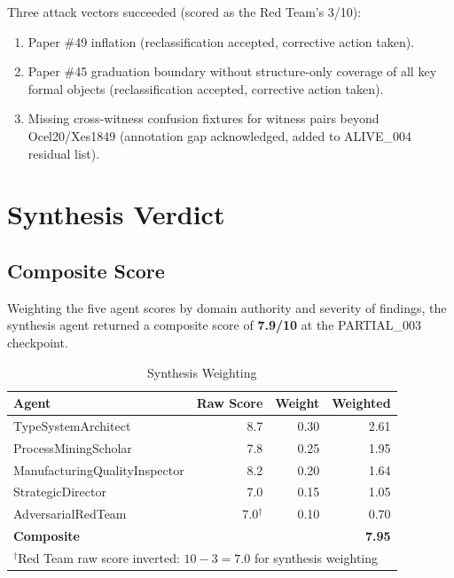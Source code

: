 Three attack vectors succeeded (scored as the Red Team's 3/10):

\begin{enumerate}
  \item Paper \#49 inflation (reclassification accepted, corrective action
    taken).
  \item Paper \#45 graduation boundary without structure-only coverage of all
    key formal objects (reclassification accepted, corrective action taken).
  \item Missing cross-witness confusion fixtures for witness pairs beyond
    Ocel20/Xes1849 (annotation gap acknowledged, added to ALIVE\_004
    residual list).
\end{enumerate}

\section{Synthesis Verdict}
\label{sec:eval-synthesis}

\subsection{Composite Score}

Weighting the five agent scores by domain authority and severity of findings,
the synthesis agent returned a composite score of \textbf{7.9/10} at the
PARTIAL\_003 checkpoint.

\begin{table}[ht]
  \centering
  \caption{Synthesis Weighting}
  \label{tab:eval-synthesis}
  \begin{tabular}{lrrr}
    \toprule
    Agent & Raw Score & Weight & Weighted \\
    \midrule
    TypeSystemArchitect          & 8.7  & 0.30 & 2.61 \\
    ProcessMiningScholar         & 7.8  & 0.25 & 1.95 \\
    ManufacturingQualityInspector & 8.2 & 0.20 & 1.64 \\
    StrategicDirector            & 7.0  & 0.15 & 1.05 \\
    AdversarialRedTeam           & 7.0$^\dagger$ & 0.10 & 0.70 \\
    \midrule
    \textbf{Composite}           &      &      & \textbf{7.95} \\
    \bottomrule
    \multicolumn{4}{l}{$^\dagger$Red Team raw score inverted: $10 - 3 = 7.0$ for synthesis weighting} \\
  \end{tabular}
\end{table}

